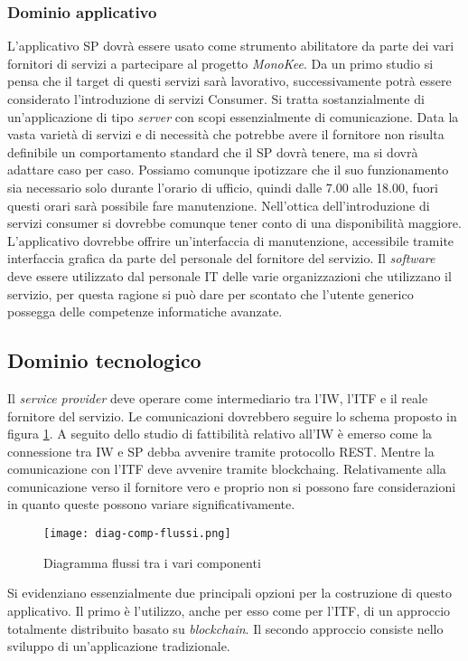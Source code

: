 \subsubsection{Dominio applicativo}
L’applicativo SP dovrà essere usato come strumento abilitatore da parte dei vari fornitori di servizi a partecipare al progetto \emph{MonoKee}. Da un primo studio si pensa che il target di questi servizi sarà lavorativo, successivamente potrà essere considerato l’introduzione di servizi Consumer. Si tratta sostanzialmente di un’applicazione di tipo \emph{server} con scopi essenzialmente di comunicazione. Data la vasta varietà di servizi e di necessità che potrebbe avere il fornitore non risulta definibile un comportamento standard che il SP dovrà tenere, ma si dovrà adattare caso per caso. Possiamo comunque ipotizzare che il suo funzionamento sia necessario solo durante l’orario di ufficio, quindi dalle 7.00 alle 18.00, fuori questi orari sarà possibile fare manutenzione. Nell’ottica dell’introduzione di servizi consumer si dovrebbe comunque tener conto di una disponibilità maggiore. L’applicativo dovrebbe offrire un’interfaccia di manutenzione, accessibile tramite interfaccia grafica da parte del personale del fornitore del servizio. Il \emph{software} deve essere utilizzato dal personale IT delle varie organizzazioni che utilizzano il servizio, per questa ragione si può dare per scontato che l’utente generico possegga delle competenze informatiche avanzate. 
\subsection{Dominio tecnologico}
Il \emph{service provider} deve operare come intermediario tra l’IW, l’ITF e il reale fornitore del servizio. Le comunicazioni dovrebbero seguire lo schema proposto in figura \ref{fig:diag-flussi}. 
A seguito dello studio di fattibilità relativo all’IW è emerso come la connessione tra IW e SP debba avvenire tramite protocollo REST. Mentre la comunicazione con l’ITF deve avvenire tramite \gls{blockchaing}. Relativamente alla comunicazione verso il fornitore vero e proprio non si possono fare considerazioni in quanto queste possono variare significativamente.

\begin{figure}[!h]
    \centering
    \texttt{[image: diag-comp-flussi.png]} 
    \caption{Diagramma flussi tra i vari componenti}
    \label{fig:diag-flussi} 
\end{figure}
Si evidenziano essenzialmente due principali opzioni per la costruzione di questo applicativo. Il primo è l’utilizzo, anche per esso come per l’ITF, di un approccio totalmente distribuito basato su \emph{blockchain}.  Il secondo approccio consiste nello sviluppo di un'applicazione tradizionale.  
